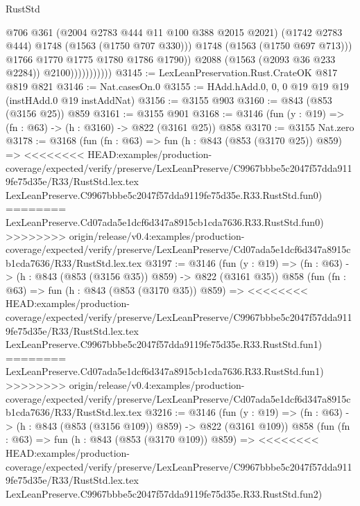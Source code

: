\begin{lexlean}{RustStd}
\begin{coremodule}
{\begin{coremodule}
{{{{{{{{                                  @706
                                  @361
                                  (@2004 @2783 @444 @11 @100 @388 @2015 @2021)
                                  (@1742 @2783 @444)
                                  @1748
                                  (@1563 (@1750 @707 @330)))
                                @1748
                                (@1563 (@1750 @697 @713)))
                              @1766
                              @1770
                              @1775
                              @1780
                              @1786
                              @1790))
                          @2088
                          (@1563 (@2093 @36 @233 @2284))
                          @2100)))))))))))
@3145 := LexLeanPreservation.Rust.CrateOK @817 @819 @821
@3146 := Nat.casesOn.{0}
@3155 := HAdd.hAdd.{0, 0, 0} @19 @19 @19 (instHAdd.{0} @19 instAddNat)
@3156 := @3155 @903
@3160 := @843 (@853 (@3156 @25)) @859
@3161 := @3155 @901
@3168 := @3146 (fun (y : @19) => (fn : @63) -> (h : @3160) -> @822 (@3161 @25)) @858
@3170 := @3155 Nat.zero
@3178 := @3168
    (fun (fn : @63) =>
    fun (h : @843 (@853 (@3170 @25)) @859) =>
<<<<<<<< HEAD:examples/production-coverage/expected/verify/preserve/LexLeanPreserve/C9967bbbe5c2047f57dda9119fe75d35e/R33/RustStd.lex.tex
    LexLeanPreserve.C9967bbbe5c2047f57dda9119fe75d35e.R33.RustStd.fun0)
========
    LexLeanPreserve.Cd07ada5e1dcf6d347a8915cb1cda7636.R33.RustStd.fun0)
>>>>>>>> origin/release/v0.4:examples/production-coverage/expected/verify/preserve/LexLeanPreserve/Cd07ada5e1dcf6d347a8915cb1cda7636/R33/RustStd.lex.tex
@3197 := @3146
    (fun (y : @19) => (fn : @63) -> (h : @843 (@853 (@3156 @35)) @859) -> @822 (@3161 @35))
    @858
    (fun (fn : @63) =>
    fun (h : @843 (@853 (@3170 @35)) @859) =>
<<<<<<<< HEAD:examples/production-coverage/expected/verify/preserve/LexLeanPreserve/C9967bbbe5c2047f57dda9119fe75d35e/R33/RustStd.lex.tex
    LexLeanPreserve.C9967bbbe5c2047f57dda9119fe75d35e.R33.RustStd.fun1)
========
    LexLeanPreserve.Cd07ada5e1dcf6d347a8915cb1cda7636.R33.RustStd.fun1)
>>>>>>>> origin/release/v0.4:examples/production-coverage/expected/verify/preserve/LexLeanPreserve/Cd07ada5e1dcf6d347a8915cb1cda7636/R33/RustStd.lex.tex
@3216 := @3146
    (fun (y : @19) => (fn : @63) -> (h : @843 (@853 (@3156 @109)) @859) -> @822 (@3161 @109))
    @858
    (fun (fn : @63) =>
    fun (h : @843 (@853 (@3170 @109)) @859) =>
<<<<<<<< HEAD:examples/production-coverage/expected/verify/preserve/LexLeanPreserve/C9967bbbe5c2047f57dda9119fe75d35e/R33/RustStd.lex.tex
    LexLeanPreserve.C9967bbbe5c2047f57dda9119fe75d35e.R33.RustStd.fun2)
}}}}}}}}
\end{coremodule}}
\end{coremodule}
\end{lexlean}
